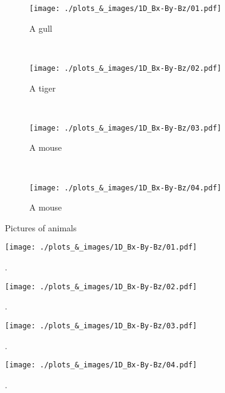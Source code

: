 \documentclass[12pt, letterpaper]{article}
\begin{document}
\begin{figure}
        \centering
        \begin{subfigure}[b]{0.5\textwidth}
                \texttt{[image: ./plots\_\&\_images/1D\_Bx-By-Bz/01.pdf]}
                \caption{A gull}
                \label{fig:gull}
        \end{subfigure}%
        ~ %
        \begin{subfigure}[b]{0.5\textwidth}
                \texttt{[image: ./plots\_\&\_images/1D\_Bx-By-Bz/02.pdf]}
                \caption{A tiger}
                \label{fig:tiger}
        \end{subfigure}
        ~ %
        \begin{subfigure}[b]{0.5\textwidth}
                \texttt{[image: ./plots\_\&\_images/1D\_Bx-By-Bz/03.pdf]}
                \caption{A mouse}
                \label{fig:mouse}
        \end{subfigure}
        ~ %
        \begin{subfigure}[b]{0.5\textwidth}
                \texttt{[image: ./plots\_\&\_images/1D\_Bx-By-Bz/04.pdf]}
                \caption{A mouse}
                \label{fig:mouse}
        \end{subfigure}
        \caption{Pictures of animals}\label{fig:}
\end{figure}







\begin{figure}[!ht]
\begin{center}
	\texttt{[image: ./plots\_\&\_images/1D\_Bx-By-Bz/01.pdf]}
	\caption{.}
	\label{fig:Bx-By-Bz_01}
\end{center}
\end{figure}
\begin{figure}[!ht]
\begin{center}
	\texttt{[image: ./plots\_\&\_images/1D\_Bx-By-Bz/02.pdf]}
	\caption{.}
	\label{fig:Bx-By-Bz_02}
\end{center}
\end{figure}
\begin{figure}[!ht]
\begin{center}
	\texttt{[image: ./plots\_\&\_images/1D\_Bx-By-Bz/03.pdf]}
	\caption{.}
	\label{fig:Bx-By-Bz_03}
\end{center}
\end{figure}
\begin{figure}[!ht]
\begin{center}
	\texttt{[image: ./plots\_\&\_images/1D\_Bx-By-Bz/04.pdf]}
	\caption{.}
	\label{fig:Bx-By-Bz_04}
\end{center}
\end{figure}
\end{document}
